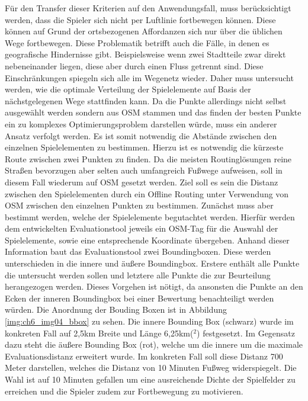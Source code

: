 Für den Transfer dieser Kriterien auf den Anwendungsfall, muss berücksichtigt werden, dass die Spieler sich nicht per Luftlinie fortbewegen können. Diese können auf Grund der ortsbezogenen Affordanzen sich nur über die üblichen Wege fortbewegen. Diese Problematik betrifft auch die Fälle, in denen es geografische Hindernisse gibt. Beispielsweise wenn zwei Stadtteile zwar direkt nebeneinander liegen, diese aber durch einen Fluss getrennt sind. Diese Einschränkungen spiegeln sich alle im Wegenetz wieder. Daher muss untersucht werden, wie die optimale Verteilung der Spielelemente auf Basis der nächstgelegenen Wege stattfinden kann. Da die Punkte allerdings nicht selbst ausgewählt werden sondern aus OSM stammen und das finden der besten Punkte ein zu komplexes Optimierungsproblem darstellen würde, muss ein anderer Ansatz verfolgt werden. Es ist somit notwendig die Abstände zwischen den einzelnen Spielelementen  zu bestimmen. Hierzu ist es notwendig die kürzeste Route zwischen zwei Punkten zu finden.
Da die meisten Routinglösungen reine Straßen bevorzugen aber selten auch umfangreich Fußwege aufweisen, soll in diesem Fall wiederum auf OSM gesetzt werden.
Ziel soll es sein die Distanz zwischen den Spielelementen durch ein Offline Routing unter Verwendung von OSM zwischen den einzelnen Punkten zu bestimmen.
Zunächst muss aber bestimmt werden, welche der Spielelemente begutachtet werden. Hierfür werden dem entwickelten Evaluationstool jeweils ein OSM-Tag für die Auswahl der Spielelemente, sowie eine entsprechende Koordinate übergeben. Anhand dieser Information baut das Evaluationstool zwei Boundingboxen. Diese werden unterschieden in die innere und äußere Boundingbox. Erstere enthält alle Punkte die untersucht werden sollen und letztere alle Punkte die zur Beurteilung herangezogen werden. Dieses Vorgehen ist nötigt, da ansonsten die Punkte an den Ecken der inneren Boundingbox bei einer Bewertung benachteiligt werden würden.
Die Anordnung der Bouding Boxen ist in Abbildung \ref{img:ch6_img04_bbox} zu sehen.
Die innere Bounding Box (schwarz) wurde im konkreten Fall auf 2,5km Breite und Länge 6,25km($^2$) festgesetzt. Im Gegensatz dazu steht die äußere Bounding Box (rot), welche um die innere um die maximale Evaluationsdistanz erweitert wurde. Im konkreten Fall soll diese Distanz 700 Meter darstellen, welches die Distanz von 10 Minuten Fußweg widerspiegelt. Die Wahl ist auf 10 Minuten gefallen um eine ausreichende Dichte der Spielfelder zu erreichen und die Spieler zudem zur Fortbewegung zu motivieren.


